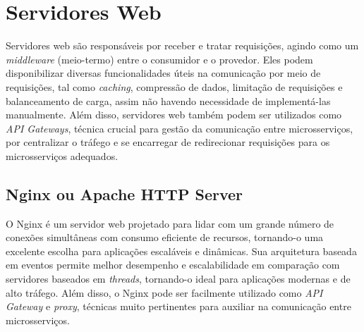 

\section{Servidores Web}
Servidores web são responsáveis por receber e tratar requisições, agindo como um \emph{middleware} (meio-termo) entre o consumidor e o provedor. Eles podem disponibilizar diversas funcionalidades úteis na comunicação por meio de requisições, tal como \emph{caching}, compressão de dados, limitação de requisições e balanceamento de carga, assim não havendo necessidade de implementá-las manualmente. Além disso, servidores web também podem ser utilizados como \emph{API Gateways}, técnica crucial para gestão da comunicação entre microsserviços, por centralizar o tráfego e se encarregar de redirecionar requisições para os microsserviços adequados. 




\subsection{Nginx ou Apache HTTP Server}
O Nginx é um servidor web projetado para lidar com um grande número de conexões simultâneas com consumo eficiente de recursos, tornando-o uma excelente escolha para aplicações escaláveis e dinâmicas. Sua arquitetura baseada em eventos permite melhor desempenho e escalabilidade em comparação com servidores baseados em \emph{threads}, tornando-o ideal para aplicações modernas e de alto tráfego. Além disso, o Nginx pode ser facilmente utilizado como \emph{API Gateway} e \emph{proxy}, técnicas muito pertinentes para auxiliar na comunicação entre microsserviços. \cite{nginx}

